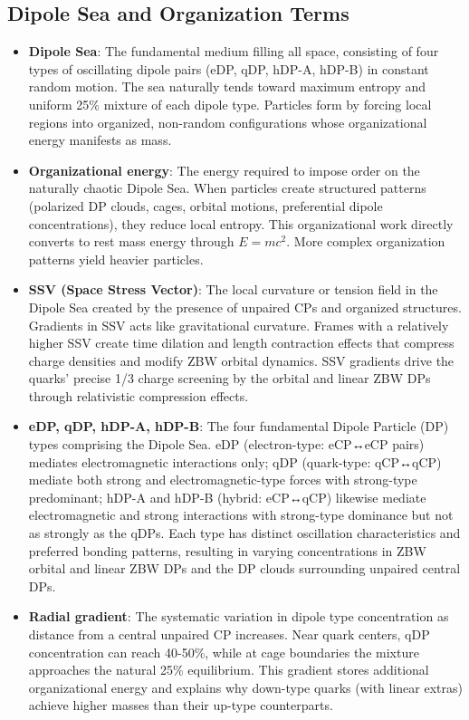 \documentclass{article}
\begin{document}
\subsection{Dipole Sea and Organization Terms}

\begin{itemize}
\item \textbf{Dipole Sea}: The fundamental medium filling all space, consisting of four types of oscillating dipole pairs (eDP, qDP, hDP-A, hDP-B) in constant random motion. The sea naturally tends toward maximum entropy and uniform 25\% mixture of each dipole type. Particles form by forcing local regions into organized, non-random configurations whose organizational energy manifests as mass.

\item \textbf{Organizational energy}: The energy required to impose order on the naturally chaotic Dipole Sea. When particles create structured patterns (polarized DP clouds, cages, orbital motions, preferential dipole concentrations), they reduce local entropy. This organizational work directly converts to rest mass energy through $E = mc^2$. More complex organization patterns yield heavier particles.

\item \textbf{SSV (Space Stress Vector)}: The local curvature or tension field in the Dipole Sea created by the presence of unpaired CPs and organized structures. Gradients in SSV acts like gravitational curvature. Frames with a relatively higher SSV create time dilation and length contraction effects that compress charge densities and modify ZBW orbital dynamics. SSV gradients drive the quarks' precise 1/3 charge screening by the orbital and linear ZBW DPs through relativistic compression effects.

\item \textbf{eDP, qDP, hDP-A, hDP-B}: The four fundamental Dipole Particle (DP) types comprising the Dipole Sea. eDP (electron-type: eCP↔eCP pairs) mediates electromagnetic interactions only; qDP (quark-type: qCP↔qCP) mediate both strong and electromagnetic-type forces with strong-type predominant; hDP-A and hDP-B (hybrid: eCP↔qCP) likewise mediate electromagnetic and strong interactions with strong-type dominance but not as strongly as the qDPs. Each type has distinct oscillation characteristics and preferred bonding patterns, resulting in varying concentrations in ZBW orbital and linear ZBW DPs and the DP clouds surrounding unpaired central DPs.

\item \textbf{Radial gradient}: The systematic variation in dipole type concentration as distance from a central unpaired CP increases. Near quark centers, qDP concentration can reach 40-50\%, while at cage boundaries the mixture approaches the natural 25\% equilibrium. This gradient stores additional organizational energy and explains why down-type quarks (with linear extras) achieve higher masses than their up-type counterparts.
\end{itemize}
\end{document}
